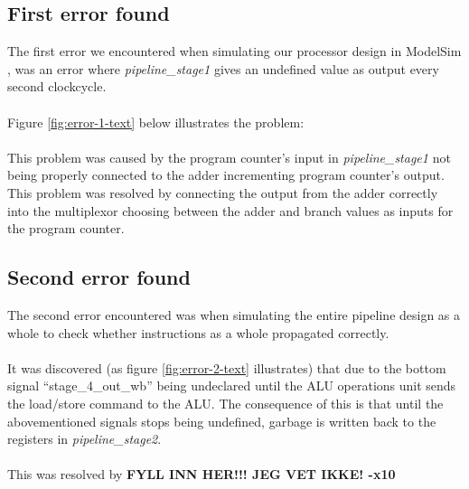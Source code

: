 \subsection{First error found}
The first error we encountered when simulating our processor design in ModelSim
\cite{modelsim}, was an error where \emph{pipeline\_stage1} gives an undefined
value as output every second clockcycle.
\paragraph*{}
Figure \ref{fig:error-1-text} below illustrates the problem:

\paragraph*{}
This problem was caused by the program counter's input in
\emph{pipeline\_stage1} not being properly connected to the adder incrementing
program counter's output. This problem was resolved by connecting the output
from the adder correctly into the multiplexor choosing between the adder and
branch values as inputs for the program counter.

\subsection{Second error found}
The second error encountered was when simulating the entire pipeline design as
a whole to check whether instructions as a whole propagated correctly.
\paragraph*{}
It was discovered (as figure \ref{fig:error-2-text} illustrates) that due to the
bottom signal ``stage\_4\_out\_wb'' being undeclared until the ALU operations unit
sends the load/store command to the ALU. The consequence of this is that until
the abovementioned signals stops being undefined, garbage is written back to the
registers in \emph{pipeline\_stage2}.

\paragraph*{}
This was resolved by\newline
\textbf{FYLL INN HER!!! JEG VET IKKE! -x10}
